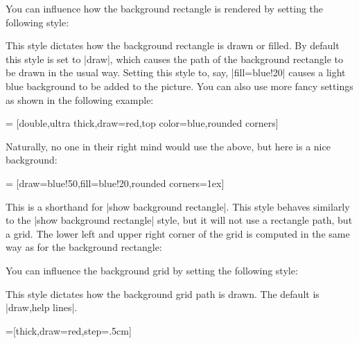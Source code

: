 \begin{itemize}
  You can influence how the background rectangle is rendered by setting
  the following style:
  \begin{itemize}
    This style dictates how the background rectangle is drawn or
    filled. By default this style is set to |draw|, which causes the
    path of the background rectangle to be drawn in the usual
    way. Setting this style to, say, |fill=blue!20| causes a light
    blue background to be added to the picture. You can also use more
    fancy settings as shown in the following example:
\begin{codeexample}[]
=
  [double,ultra thick,draw=red,top color=blue,rounded corners]      
\end{codeexample}
    Naturally, no one in their right mind would use the above, but
    here is a nice background: 
\begin{codeexample}[]
=
  [draw=blue!50,fill=blue!20,rounded corners=1ex]      
\end{codeexample}
\end{itemize}
  This is a shorthand for |show background rectangle|.
  This style behaves similarly to the |show background rectangle|
  style, but it will not use a rectangle path, but a grid. The lower
  left and upper right corner of the grid is computed in the same way
  as for the background rectangle:
\begin{codeexample}[]
\end{codeexample}
  You can influence the background grid by setting
  the following style:
  \begin{itemize}
    This style dictates how the background grid path is drawn. The
    default is |draw,help lines|. 
\begin{codeexample}[]
=[thick,draw=red,step=.5cm]
\end{codeexample}
\end{itemize}
\end{itemize}
